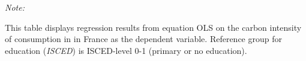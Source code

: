 \begin{table}[htbp!]
\begin{adjustbox}{width = 1\textwidth, max height = 0.95\textheight, center}
\begin{threeparttable}[b]
         \begin{tablenotes}\item \medskip \textit{Note:}
            \item This table displays regression results from equation OLS on the carbon intensity of consumption in  in France as the dependent variable. Reference group for education (\textit{ISCED}) is ISCED-level 0-1 (primary or no education).
         \end{tablenotes}
      \end{threeparttable}
   \end{adjustbox}
\end{table}


